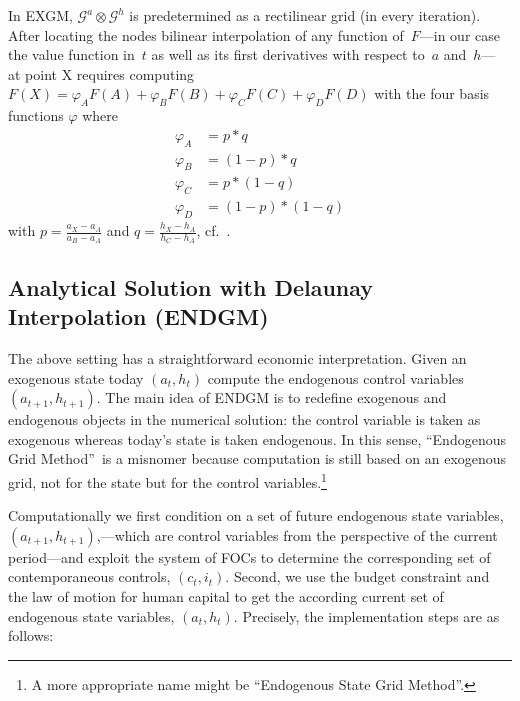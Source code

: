 \documentclass[a4paper,12pt]{article}
\begin{document}
In EXGM, $\mathcal{G}^{a}\otimes\mathcal{G}^{h}$ is predetermined as a rectilinear grid (in every iteration). After locating the nodes bilinear interpolation of any function of~$F$---in our case the value function in~$t$ as well as its first derivatives with respect to~$a$ and~$h$--- at point X requires computing $F\left(  X\right)  =\varphi_{A}F(A)+\varphi_{B}F(B)+\varphi_{C}F(C)+\varphi_{D}F(D)$ with the four basis functions $\varphi$ where
\begin{align*}
	\varphi_{A}  &  = p \ast q  \\
	\varphi_{B}  &  = \left(1 - p\right) \ast q  \\
	\varphi_{C}  &  = p \ast \left(1 - q\right)  \\
	\varphi_{D}  &  = \left(1 - p\right) \ast \left(1 - q\right)
\end{align*}
with $p = \frac{a_{X} - a_{A}} {a_{B} - a_{A}}$ and $q = \frac{h_{X} - h_{A}} {h_{C} - h_{A}}$, cf.~.

\subsection{Analytical Solution with Delaunay Interpolation \newline(ENDGM)}

\label{ss:analendgm}

The above setting has a straightforward economic interpretation. Given an exogenous state today $\left(a_{t},h_{t}\right)$ compute the endogenous control variables $\left(a_{t+1},h_{t+1}\right)$. The main idea of ENDGM is to redefine exogenous and endogenous objects in the numerical solution: the control variable is taken as exogenous whereas today's state is taken endogenous. In this sense, \textquotedblleft Endogenous Grid Method\textquotedblright\ is a misnomer because computation is still based on an exogenous grid, not for the state but for the control variables.\footnote{A more appropriate name might be \textquotedblleft Endogenous State Grid Method\textquotedblright.}

Computationally we first condition on a set of future endogenous state variables, $\left(a_{t+1},h_{t+1}\right)$,---which are control variables from the perspective of the current period---and exploit the system of FOCs to determine the corresponding set of contemporaneous controls, $\left(c_{t},i_{t}\right)$. Second, we use the budget constraint and the law of motion for human capital to get the according current set of endogenous state variables, $\left(a_{t},h_{t}\right)$. Precisely, the implementation steps are as follows:
\end{document}
